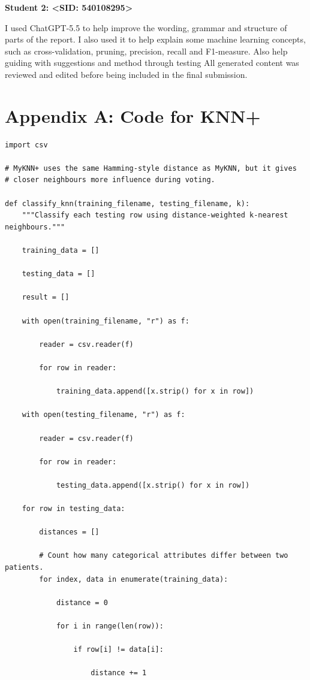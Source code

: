 \documentclass[12pt,a4paper]{article}
\begin{document}
\textbf{Student 2: \textless SID: 540108295\textgreater}


I used ChatGPT-5.5 to help improve the wording, grammar and structure of parts of the report.
I also used it to help explain some machine learning concepts, such as cross-validation, pruning, precision, recall and F1-measure. Also help guiding with suggestions and method through testing 
All generated content was reviewed and edited before being included in the final submission.

\appendix
\section*{Appendix A: Code for KNN+}
{\scriptsize
\begin{verbatim}
import csv

# MyKNN+ uses the same Hamming-style distance as MyKNN, but it gives
# closer neighbours more influence during voting.

def classify_knn(training_filename, testing_filename, k):
    """Classify each testing row using distance-weighted k-nearest neighbours."""

    training_data = []

    testing_data = []

    result = []

    with open(training_filename, "r") as f:

        reader = csv.reader(f)

        for row in reader:

            training_data.append([x.strip() for x in row])

    with open(testing_filename, "r") as f:

        reader = csv.reader(f)

        for row in reader:

            testing_data.append([x.strip() for x in row])

    for row in testing_data:

        distances = []

        # Count how many categorical attributes differ between two patients.
        for index, data in enumerate(training_data):

            distance = 0

            for i in range(len(row)):

                if row[i] != data[i]:

                    distance += 1


\end{verbatim}}
\end{document}
